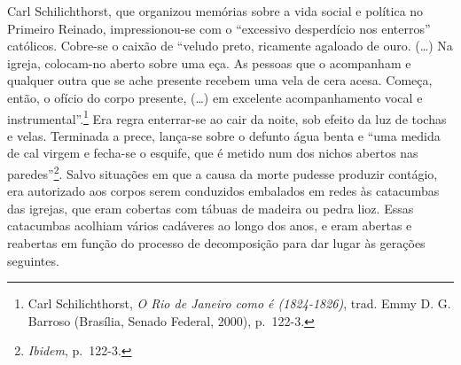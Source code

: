 Carl Schilichthorst, que organizou memórias sobre a vida social e
política no Primeiro Reinado, impressionou-se com o ``excessivo
desperdício nos enterros'' católicos. Cobre-se o caixão de ``veludo
preto, ricamente agaloado de ouro. (\ldots{}) Na igreja, colocam-no
aberto sobre uma eça. As pessoas que o acompanham e qualquer outra que
se ache presente recebem uma vela de cera acesa. Começa, então, o ofício
do corpo presente, (\ldots{}) em excelente acompanhamento vocal e
instrumental''.\footnote{Carl Schilichthorst, \textit{O Rio de Janeiro
  como é (1824-1826)}, trad. Emmy D. G. Barroso (Brasília, Senado
  Federal, 2000), p.~122-3.} Era regra enterrar-se ao cair da noite, sob
efeito da luz de tochas e velas. Terminada a prece, lança-se sobre o
defunto água benta e ``uma medida de cal virgem e fecha-se o esquife,
que é metido num dos nichos abertos nas paredes''\footnote{\textit{Ibidem},
  p.~122-3.}. Salvo situações em que a causa da morte pudesse produzir
contágio, era autorizado aos corpos serem conduzidos embalados em redes
às catacumbas das igrejas, que eram cobertas com tábuas de madeira ou
pedra lioz. Essas catacumbas acolhiam vários cadáveres ao longo dos
anos, e eram abertas e reabertas em função do processo de decomposição
para dar lugar às gerações seguintes.

